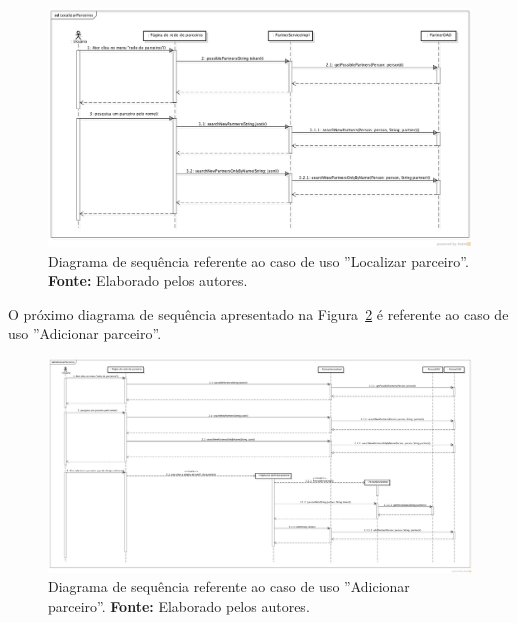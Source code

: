 \begin{landscape}
\newpage
\captionsetup[figure]{list=no}
\begin{figure}[h!]
	\centerline{\includegraphics[scale=0.5]{./imagens/apendices/diagrama-sequencia-localizar-parceiros.png}}
	\caption[Diagrama de sequência referente ao caso de uso ''Localizar parceiro''.]
	{Diagrama de sequência referente ao caso de uso ''Localizar parceiro''. \textbf{Fonte:} Elaborado pelos autores.}
	\label{fig:ap1:diagrama_sequencia_localizar_parceiro}
\end{figure}

O próximo diagrama de sequência apresentado na Figura~\ref{fig:ap1:diagrama_sequencia_adicionar_parceiro} é referente ao caso de uso ''Adicionar parceiro''.

\newpage
\captionsetup[figure]{list=no}
\begin{figure}[h!]
	\centerline{\includegraphics[scale=0.3]{./imagens/apendices/diagrama-sequencia-adicionar-parceiros.png}}
	\caption[Diagrama de sequência referente ao caso de uso ''Adicionar parceiro''.]
	{Diagrama de sequência referente ao caso de uso ''Adicionar parceiro''. \textbf{Fonte:} Elaborado pelos autores.}
	\label{fig:ap1:diagrama_sequencia_adicionar_parceiro}
\end{figure}


\end{landscape}
